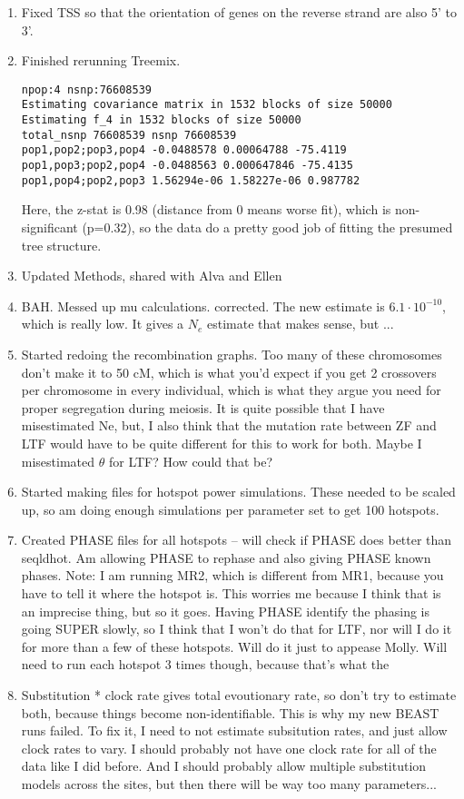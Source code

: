 \documentclass[idxtotoc,hyperref,openany,oneside]{labbook} %
\begin{document}
\begin{enumerate}
\item Fixed TSS so that the orientation of genes on the reverse strand are also 5' to 3'.
\item Finished rerunning Treemix.
\begin{verbatim}
npop:4 nsnp:76608539
Estimating covariance matrix in 1532 blocks of size 50000
Estimating f_4 in 1532 blocks of size 50000
total_nsnp 76608539 nsnp 76608539
pop1,pop2;pop3,pop4 -0.0488578 0.00064788 -75.4119
pop1,pop3;pop2,pop4 -0.0488563 0.000647846 -75.4135
pop1,pop4;pop2,pop3 1.56294e-06 1.58227e-06 0.987782
\end{verbatim}
Here, the z-stat is 0.98 (distance from 0 means worse fit), which is non-significant (p=0.32), so the data do a pretty good job of fitting the presumed tree structure.
\item Updated Methods, shared with Alva and Ellen
\item BAH. Messed up mu calculations. corrected. The new estimate is $6.1 \cdot 10^{-10}$, which is really low. It gives a $N_e$ estimate that makes sense, but ...
\item Started redoing the recombination graphs. Too many of these chromosomes don't make it to 50 cM, which is what you'd expect if you get 2 crossovers per chromosome in every individual, which is what they argue you need for proper segregation during meiosis. It is quite possible that I have misestimated Ne, but, I also think that the mutation rate between ZF and LTF would have to be quite different for this to work for both. Maybe I misestimated $\theta$ for LTF? How could that be?
\item Started making files for hotspot power simulations. These needed to be scaled up, so am doing enough simulations per parameter set to get 100 hotspots.
\item Created PHASE files for all hotspots -- will check if PHASE does better than seqldhot. Am allowing PHASE to rephase and also giving PHASE known phases. Note: I am running MR2, which is different from MR1, because you have to tell it where the hotspot is. This worries me because I think that is an imprecise thing, but so it goes. Having PHASE identify the phasing is going SUPER slowly, so I think that I won't do that for LTF, nor will I do it for more than a few of these hotspots. Will do it just to appease Molly. Will need to run each hotspot 3 times though, because that's what the 
\item Substitution * clock rate gives total evoutionary rate, so don't try to estimate both, because things become non-identifiable. This is why my new BEAST runs failed. To fix it, I need to not estimate subsitution rates, and just allow clock rates to vary. I should probably not have one clock rate for all of the data like I did before. And I should probably allow multiple substitution models across the sites, but then there will be way too many parameters...
\end{enumerate}
\end{document}
